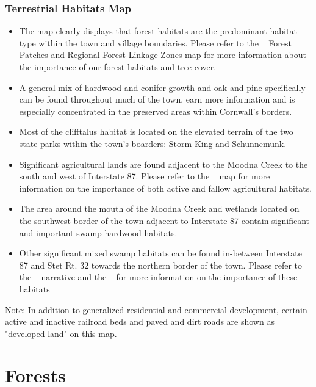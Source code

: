 \label{map:terrestrialhabitats}
\subsection*{Terrestrial Habitats Map}\label{subsec:terrestrialhabitatsmap}
\begin{itemize}
    \item The map clearly displays that forest habitats are the predominant
    habitat type within the town and village boundaries. Please refer to the
~ Forest Patches and Regional Forest Linkage Zones map for more information about
the importance of our forest habitats and tree cover.
    \item A general mix of hardwood and conifer growth and oak and pine specifically can be found
        throughout much of the town, earn more information and is especially
        concentrated in the preserved areas within Cornwall’s borders.
    \item Most of the cliff\/talus habitat is located on the elevated terrain of 
         the two state parks within the town’s boarders: Storm King and Schunnemunk.
    \item Significant agricultural lands are found adjacent to the Moodna Creek to 
        the south and west of Interstate 87. Please refer to the ~ map for more information on the importance
        of both active and fallow agricultural habitats.
    \item The area around the mouth of the Moodna Creek and wetlands located on
        the southwest border of the town adjacent to Interstate 87 contain
        significant and important swamp hardwood habitats.  
    \item Other significant
       mixed swamp habitats can be found in-between Interstate 87 and Stet Rt. 32
        towards the northern border of the town. Please refer to the ~
        narrative and the ~ for more
        information on the importance of these habitats
\end{itemize}
Note: In addition to generalized residential and commercial development, 
certain active and inactive railroad beds and paved and dirt roads are shown
as "developed land" on this map.

\chapter{Forests}\label{subsec:forests}
